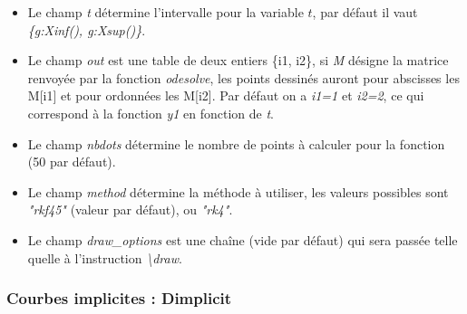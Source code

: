 \documentclass[%
10pt,%
a4paper,%
french,%
]%
{article}%
\begin{document}
\begin{itemize}
\begin{itemize}
      \begin{itemize}
        \item Le champ \emph{t} détermine l'intervalle pour la variable \(t\), par défaut il vaut \emph{\{g:Xinf(), g:Xsup()\}}.
        \item Le champ \emph{out} est une table de deux entiers \{i1, i2\}, si \emph{M} désigne la matrice renvoyée par la fonction \emph{odesolve}, les points dessinés auront pour abscisses les M{[}i1{]} et pour ordonnées les M{[}i2{]}. Par défaut on a \emph{i1=1} et \emph{i2=2}, ce qui correspond à la fonction \emph{y1} en fonction de \emph{t}.
        \item Le champ \emph{nbdots} détermine le nombre de points à calculer pour la fonction (50 par défaut).
        \item Le champ \emph{method} détermine la méthode à utiliser, les valeurs possibles sont \emph{"rkf45"} (valeur par défaut), ou \emph{"rk4"}.
        \item Le champ \emph{draw\_options} est une chaîne (vide par défaut) qui sera passée telle quelle à l'instruction \emph{\textbackslash draw}.
      \end{itemize}
  \end{itemize}
\end{itemize}

\subsubsection{Courbes implicites : Dimplicit}
\end{document}
